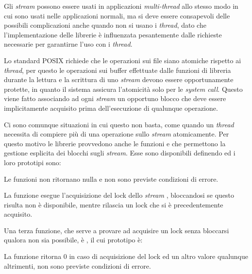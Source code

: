 Gli \textit{stream} possono essere usati in applicazioni \textit{multi-thread}
allo stesso modo in cui sono usati nelle applicazioni normali, ma si deve
essere consapevoli delle possibili complicazioni anche quando non si usano i
\textit{thread}, dato che l'implementazione delle librerie è influenzata
pesantemente dalle richieste necessarie per garantirne l'uso con i
\textit{thread}.

Lo standard POSIX richiede che le operazioni sui file siano atomiche rispetto
ai \textit{thread}, per questo le operazioni sui buffer effettuate dalle
funzioni di libreria durante la lettura e la scrittura di uno \textit{stream}
devono essere opportunamente protette, in quanto il sistema assicura
l'atomicità solo per le \textit{system call}. Questo viene fatto associando ad
ogni \textit{stream} un opportuno blocco che deve essere implicitamente
acquisito prima dell'esecuzione di qualunque operazione.

Ci sono comunque situazioni in cui questo non basta, come quando un
\textit{thread} necessita di compiere più di una operazione sullo
\textit{stream} atomicamente. Per questo motivo le librerie provvedono anche
le funzioni  e  che permettono la gestione
esplicita dei blocchi sugli \textit{stream}. Esse sono disponibili definendo
 ed i loro prototipi sono:

\begin{funcproto}{
}
{Le funzioni non ritornano nulla e non sono previste condizioni di errore.}  
\end{funcproto}

La funzione  esegue l'acquisizione del lock dello
\textit{stream} , bloccandosi se questo risulta non è
disponibile, mentre  rilascia un lock che si è
precedentemente acquisito.

Una terza funzione, che serve a provare ad acquisire un lock senza bloccarsi
qualora non sia possibile, è , il cui prototipo è:

\begin{funcproto}{
}

{La funzione ritorna $0$ in caso di acquisizione del lock ed un altro valore
  qualunque altrimenti, non sono previste condizioni di errore.}
\end{funcproto}

